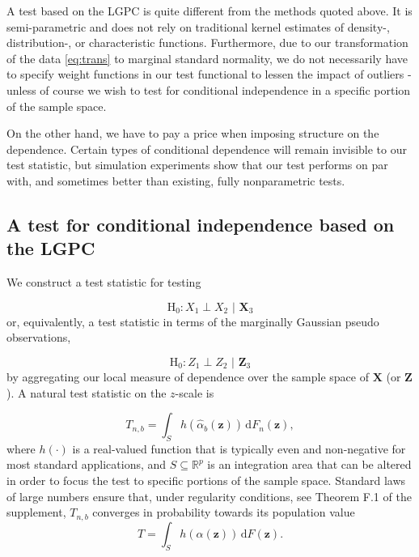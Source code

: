 \documentclass[
  12pt,
  letterpaper]{article}
\newcommand{\X}{\bm{X}}
\newcommand{\Z}{\bm{Z}}
\newcommand{\z}{\bm{z}}
\newcommand{\di}{\,\textrm{d}}
\theoremstyle{definition}
\theoremstyle{definition}
\theoremstyle{definition}
\theoremstyle{remark}
\begin{document}
A test based on the LGPC is quite different from the methods quoted above. It is semi-parametric and does not rely on traditional kernel estimates of density-, \mbox{distribution-,} or characteristic functions. Furthermore, due to our transformation of the data \eqref{eq:trans} to marginal standard normality, we do not necessarily have to specify weight functions in our test functional to lessen the impact of outliers - unless of course we wish to test for conditional independence in a specific portion of the sample space.

On the other hand, we have to pay a price when imposing structure on the dependence. Certain types of conditional dependence will remain invisible to our test statistic, but simulation experiments show that our test performs on par with, and sometimes better than existing, fully nonparametric tests.

\hypertarget{thetest}{%
\subsection{A test for conditional independence based on the LGPC}\label{thetest}}

We construct a test statistic for testing

\[\textrm{H}_0: X_1 \perp X_2 \,\, | \,\, \X_3\]
or, equivalently, a test statistic in terms of the marginally Gaussian pseudo observations,

\begin{equation}
\textrm{H}_0: Z_1 \perp Z_2 \,\, | \,\, \Z_3
\label{eq:ci-test}
\end{equation}
by aggregating our local measure of dependence over the sample space of \(\X\) (or \(\Z\)). A natural test statistic on the \(z\)-scale is

\begin{equation}
T_{n,b} = \int_S h\left( \widehat \alpha_b(\z)  \right) \di F_n(\z),
\label{eq:teststatistic}
\end{equation}
where \(h(\cdot)\) is a real-valued function that is typically even and non-negative for most standard applications, and \(S \subseteq \mathbb{R}^p\) is an integration area that can be altered in order to focus the test to specific portions of the sample space. Standard laws of large numbers ensure that, under regularity conditions, see Theorem F.1 of the supplement, \(T_{n,b}\) converges in probability towards its population value \[T = \int_S h\left(\alpha(\z)\right) \di F(\z).\]
\end{document}

